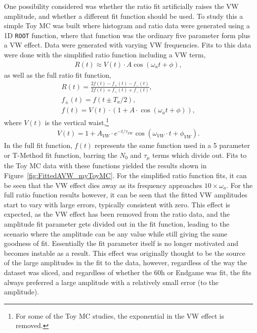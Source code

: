 \documentclass[12pt,letterpaper]{article}
\newcommand{\figref}[1]{Figure~\ref{#1}}
\begin{document}
One possibility considered was whether the ratio fit artificially raises the VW amplitude, and whether a different fit function should be used. To study this a simple Toy MC was built where histogram and ratio data were generated using a 1D \texttt{ROOT} function, where that function was the ordinary five parameter form plus a VW effect. Data were generated with varying VW frequencies. Fits to this data were done with the simplified ratio function including a VW term,
    \begin{align} \label{eq:threeparamratio}
        R(t) \approx V(t) \cdot A \cos(\omega_{a}t + \phi),
    \end{align}
as well as the full ratio fit function,
    \begin{gather}
        R(t) = \frac{2f(t) - f_{+}(t) - f_{-}(t)}{2f(t) + f_{+}(t) + f_{-}(t)}, \\
        f_{\pm}(t) = f(t \pm T_{a}/2), \\
        f(t) = V(t) \cdot (1 + A \cdot \cos(\omega_{a}t + \phi)),
    \label{eq:fullratiofunction}
    \end{gather}
where $V(t)$ is the vertical waist,\footnote{For some of the Toy MC studies, the exponential in the VW effect is removed.}
    \begin{align} \label{eq:VW}
        V(t) = 1 + A_{VW} \cdot e^{-t/\tau_{VW}} \cos{(\omega_{VW} \cdot t + \phi_{VW})}.
    \end{align}
In the full fit function, $f(t)$ represents the same function used in a 5 parameter or T-Method fit function, barring the $N_{0}$ and $\tau_{\mu}$ terms which divide out. Fits to the Toy MC data with these functions yielded the results shown in \figref{fig:FittedAVW_myToyMC}. For the simplified ratio function fits, it can be seen that the VW effect dies away as its frequency approaches $10 \times \omega_{a}$. For the full ratio function results however, it can be seen that the fitted VW amplitudes start to vary with large errors, typically consistent with zero. This effect is expected, as the VW effect has been removed from the ratio data, and the amplitude fit parameter gets divided out in the fit function, leading to the scenario where the amplitude can be any value while still giving the same goodness of fit. Essentially the fit parameter itself is no longer motivated and becomes instable as a result. This effect was originally thought to be the source of the large amplitudes in the fit to the data, however, regardless of the way the dataset was sliced, and regardless of whether the 60h or Endgame was fit, the fits always preferred a large amplitude with a relatively small error (to the amplitude).
\end{document}

